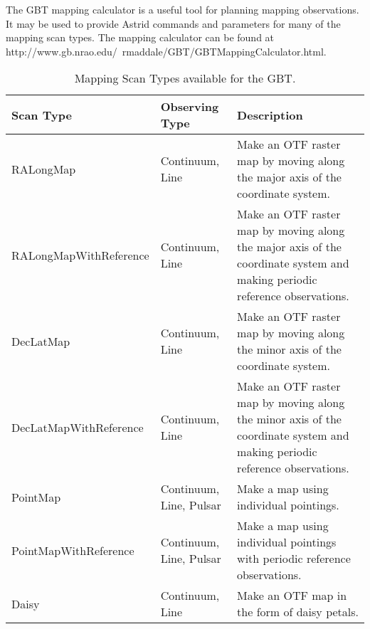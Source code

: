 The \gls{GBT} mapping calculator is a useful tool for planning mapping observations.
It may be used to provide \gls{Astrid} commands and
parameters for many of the mapping scan types.  The mapping calculator can be
found at
{http://www.gb.nrao.edu/~rmaddale/GBT/GBTMappingCalculator.html}.


\begin{table}[!h]
\begin{center}
\caption[Mapping Scan Types]{Mapping Scan Types available for the \gls{GBT}.
\label{table:mapping_scans}}
{\footnotesize
\begin{tabular}{l
                l
                p{}}
\toprule
{\bf Scan Type} & {\bf Observing Type} & {\bf Description} \\
\midrule
RALongMap              & Continuum, Line & Make an \gls{OTF} raster map by
moving along the major axis of the coordinate system. \\
\cmidrule(lr){1-3}
RALongMapWithReference & Continuum, Line & Make an \gls{OTF} raster map by
moving along the major axis of the coordinate system and making periodic
reference observations.\\
\cmidrule(lr){1-3}
DecLatMap              & Continuum, Line & Make an \gls{OTF} raster map by
moving along the minor axis of the coordinate system. \\
\cmidrule(lr){1-3}
DecLatMapWithReference & Continuum, Line & Make an \gls{OTF} raster map by
moving along the minor axis of the coordinate system and making periodic
reference observations.\\
\cmidrule(lr){1-3}
PointMap               & Continuum, Line, Pulsar & Make a map using individual
pointings.\\
\cmidrule(lr){1-3}
PointMapWithReference  & Continuum, Line, Pulsar & Make a map using individual
                         pointings with periodic \newline reference observations.\\
\cmidrule(lr){1-3}
Daisy                  & Continuum, Line & Make an \gls{OTF} map in the form of
                                           daisy petals.\\
\bottomrule
\end{tabular}
}
\end{center}
\end{table}

